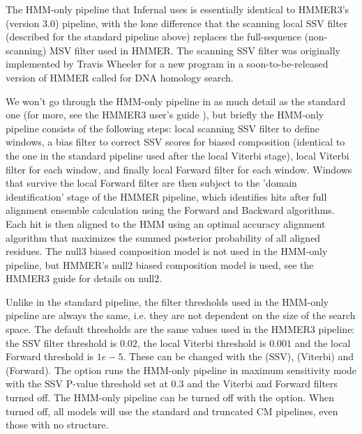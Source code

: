 The HMM-only pipeline that Infernal uses is essentially identical to
HMMER3's (version 3.0) pipeline, with the lone
difference that the scanning local SSV filter (described for the
standard pipeline above) replaces the full-sequence (non-scanning) MSV
filter used in HMMER. The scanning SSV filter was originally
implemented by Travis Wheeler for a new program in a
soon-to-be-released version of HMMER called  for DNA
homology search.

We won't go through the HMM-only pipeline in as much detail as the
standard one (for more, see the HMMER3 user's guide
\citep{hmmer3guide}), but briefly the HMM-only pipeline consists of
the following steps: local scanning SSV filter to define windows, a
bias filter to correct SSV scores for biased composition (identical to
the one in the standard pipeline used after the local Viterbi stage),
local Viterbi filter for each window, and finally local Forward filter
for each window. Windows that survive the local Forward filter are
then subject to the 'domain identification' stage of the HMMER
pipeline, which identifies hits after full alignment ensemble
calculation using the Forward and Backward algorithms. Each hit is
then aligned to the HMM using an optimal accuracy alignment algorithm
that maximizes the summed posterior probability of all aligned
residues. The null3 biased composition model is not used in the
HMM-only pipeline, but HMMER's null2 biased composition model is used, 
see the HMMER3 guide for details on null2.

Unlike in the standard pipeline, the filter thresholds used in the
HMM-only pipeline are always the same, i.e. they are not dependent on
the size of the search space. The default thresholds are the same
values used in the HMMER3 pipeline: the SSV filter threshold is
$0.02$, the local Viterbi threshold is $0.001$ and the local Forward
threshold is $1e-5$. These can be changed with the 
(SSV),  (Viterbi) and  (Forward). The
 option runs the HMM-only pipeline in maximum
sensitivity mode with the SSV P-value threshold set at 0.3 and the
Viterbi and Forward filters turned off. The HMM-only pipeline can be
turned off with the  option. When turned off, all
models will use the standard and truncated CM pipelines, even those
with no structure.

